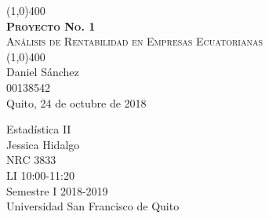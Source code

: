 \documentclass[12pt,a4paper,twoside]{article}
\begin{document}
    \begin{titlepage}
        \begin{center}
            \vspace*{1cm}
            \line(1,0){400}\\
            \Huge{\textsc{{\textbf{Proyecto No. 1}}}}\\
            \Huge{\textsc{Análisis de Rentabilidad en Empresas Ecuatorianas}}\\
            \line(1,0){400}\\
            \vspace*{1cm}
            \Large{Daniel Sánchez}\\
            \Large{00138542}\\
            \large{Quito, 24 de octubre de 2018}\\
        \end{center}
    \vspace*{8cm}
    Estadística II\\
    Jessica Hidalgo \\
    NRC 3833\\
    LI 10:00-11:20\\
    Semestre I 2018-2019\\
    Universidad San Francisco de Quito
    \clearpage

\end{titlepage}
\end{document}
